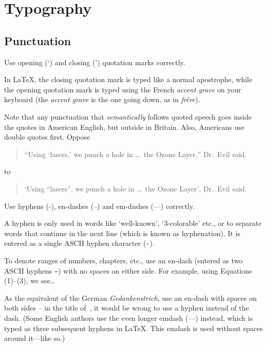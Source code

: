 \chapter{Typography}


\section{Punctuation}

\begin{Rule}
  Use opening (`) and closing (') quotation marks correctly.
\end{Rule}

In \LaTeX, the closing quotation mark is typed like a normal
apostrophe, while the opening quotation mark is typed using the French
\emph{accent grave} on your keyboard (the \emph{accent grave} is the
one going down, as in \emph{frère}).

Note that any punctuation that \emph{semantically} follows quoted
speech goes inside the quotes in American English, but outside in
Britain.  Also, Americans use double quotes first.  Oppose
\begin{quote}
  ``Using `lasers,' we punch a hole in \ldots\ the Ozone Layer,''
  Dr.\ Evil said.
\end{quote}
to
\begin{quote}
  `Using ``lasers'', we punch a hole in \ldots\ the Ozone Layer',
  Dr.\ Evil said.
\end{quote}

\begin{Rule}
  Use hyphens (-), en-dashes (--) and em-dashes (---) correctly.
\end{Rule}

A hyphen is only used in words like `well-known', `$3$-colorable'
etc., or to separate words that continue in the next line (which is
known as hyphenation).  It is entered as a single ASCII hyphen
character (\texttt{-}).

To denote ranges of numbers, chapters, etc., use an en-dash (entered
as two ASCII hyphens \texttt{--}) with no spaces on either side.  For
example, using Equations (1)--(3), we see\ldots

As the equivalent of the German \emph{Gedankenstrich}, use an en-dash
with spaces on both sides -- in the title of~,
it would be wrong to use a hyphen instead of the dash. (Some English
authors use the even longer emdash (---) instead, which is typed as
three subsequent hyphens in \LaTeX. This emdash is used without spaces
around it---like so.)


